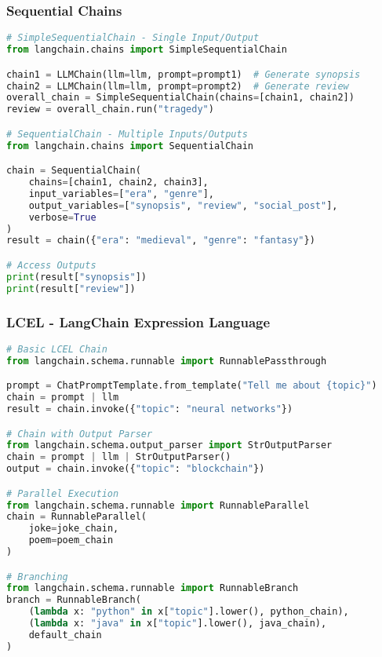 \begin{frame}[fragile]\frametitle{Sequential Chains}
\begin{lstlisting}[language=python,basicstyle=\tiny]
# SimpleSequentialChain - Single Input/Output
from langchain.chains import SimpleSequentialChain

chain1 = LLMChain(llm=llm, prompt=prompt1)  # Generate synopsis
chain2 = LLMChain(llm=llm, prompt=prompt2)  # Generate review
overall_chain = SimpleSequentialChain(chains=[chain1, chain2])
review = overall_chain.run("tragedy")

# SequentialChain - Multiple Inputs/Outputs
from langchain.chains import SequentialChain

chain = SequentialChain(
    chains=[chain1, chain2, chain3],
    input_variables=["era", "genre"],
    output_variables=["synopsis", "review", "social_post"],
    verbose=True
)
result = chain({"era": "medieval", "genre": "fantasy"})

# Access Outputs
print(result["synopsis"])
print(result["review"])
\end{lstlisting}
\end{frame}

\begin{frame}[fragile]\frametitle{LCEL - LangChain Expression Language}
\begin{lstlisting}[language=python,basicstyle=\tiny]
# Basic LCEL Chain
from langchain.schema.runnable import RunnablePassthrough

prompt = ChatPromptTemplate.from_template("Tell me about {topic}")
chain = prompt | llm
result = chain.invoke({"topic": "neural networks"})

# Chain with Output Parser
from langchain.schema.output_parser import StrOutputParser
chain = prompt | llm | StrOutputParser()
output = chain.invoke({"topic": "blockchain"})

# Parallel Execution
from langchain.schema.runnable import RunnableParallel
chain = RunnableParallel(
    joke=joke_chain,
    poem=poem_chain
)

# Branching
from langchain.schema.runnable import RunnableBranch
branch = RunnableBranch(
    (lambda x: "python" in x["topic"].lower(), python_chain),
    (lambda x: "java" in x["topic"].lower(), java_chain),
    default_chain
)
\end{lstlisting}
\end{frame}

